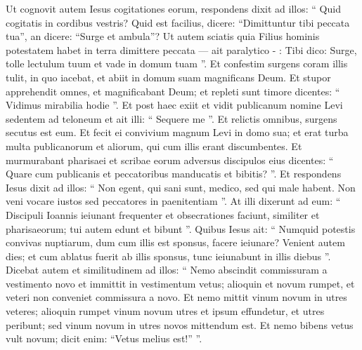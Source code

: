 \begin{biblechapter}
\begin{biblechapter}
\begin{biblechapter}
\begin{biblechapter}
\begin{biblechapter}
\verse Ut cognovit autem Iesus cogitationes eorum, respondens dixit ad illos: “ Quid cogitatis in cordibus vestris? 
\verse Quid est facilius, dicere: “Dimittuntur tibi peccata tua”, an dicere: “Surge et ambula”? 
\verse Ut autem sciatis quia Filius hominis potestatem habet in terra dimittere peccata — ait paralytico - : Tibi dico: Surge, tolle lectulum tuum et vade in domum tuam ”. 
\verse Et confestim surgens coram illis tulit, in quo iacebat, et abiit in domum suam magnificans Deum. 
\verse Et stupor apprehendit omnes, et magnificabant Deum; et repleti sunt timore dicentes: “ Vidimus mirabilia hodie ”.
 \verse Et post haec exiit et vidit publicanum nomine Levi sedentem ad teloneum et ait illi: “ Sequere me ”. 
\verse Et relictis omnibus, surgens secutus est eum. 
\verse Et fecit ei convivium magnum Levi in domo sua; et erat turba multa publicanorum et aliorum, qui cum illis erant discumbentes. 
\verse Et murmurabant pharisaei et scribae eorum adversus discipulos eius dicentes: “ Quare cum publicanis et peccatoribus manducatis et bibitis? ”. 
\verse Et respondens Iesus dixit ad illos: “ Non egent, qui sani sunt, medico, sed qui male habent. 
\verse Non veni vocare iustos sed peccatores in paenitentiam ”.
 \verse At illi dixerunt ad eum: “ Discipuli Ioannis ieiunant frequenter et obsecrationes faciunt, similiter et pharisaeorum; tui autem edunt et bibunt ”. 
\verse Quibus Iesus ait: “ Numquid potestis convivas nuptiarum, dum cum illis est sponsus, facere ieiunare? 
\verse Venient autem dies; et cum ablatus fuerit ab illis sponsus, tunc ieiunabunt in illis diebus ”. 
\verse Dicebat autem et similitudinem ad illos: “ Nemo abscindit commissuram a vestimento novo et immittit in vestimentum vetus; alioquin et novum rumpet, et veteri non conveniet commissura a novo. 
\verse Et nemo mittit vinum novum in utres veteres; alioquin rumpet vinum novum utres et ipsum effundetur, et utres peribunt; 
\verse sed vinum novum in utres novos mittendum est. 
\verse Et nemo bibens vetus vult novum; dicit enim: “Vetus melius est!” ”.
 

\end{biblechapter}
\end{biblechapter}
\end{biblechapter}
\end{biblechapter}
\end{biblechapter}
